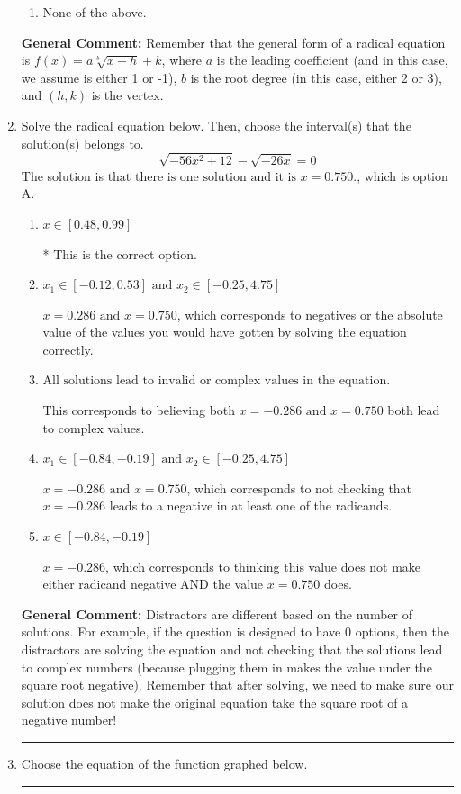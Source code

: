 \documentclass{extbook}[14pt]
\newcommand{\litem}[1]{\item #1

\rule{\textwidth}{0.4pt}}
\begin{document}
\begin{enumerate}
{\begin{enumerate}[label=\Alph*.]
\item None of the above.\end{enumerate}
\textbf{General Comment:} Remember that the general form of a radical equation is $ f(x) = a \sqrt[b]{x - h} + k $, where $a$ is the leading coefficient (and in this case, we assume is either 1 or -1), $b$ is the root degree (in this case, either 2 or 3), and $(h, k)$ is the vertex.
}
\litem{
Solve the radical equation below. Then, choose the interval(s) that the solution(s) belongs to.
\[ \sqrt{-56 x^2 + 12} - \sqrt{-26 x} = 0 \]The solution is \( \text{that there is one solution and it is } x = 0.750. \), which is option A.\begin{enumerate}[label=\Alph*.]
\item \( x \in [0.48,0.99] \)

* This is the correct option.
\item \( x_1 \in [-0.12, 0.53] \text{ and } x_2 \in [-0.25,4.75] \)

$x = 0.286 \text{ and } x = 0.750$, which corresponds to negatives or the absolute value of the values you would have gotten by solving the equation correctly.
\item \( \text{All solutions lead to invalid or complex values in the equation.} \)

This corresponds to believing both $x = -0.286 \text{ and } x = 0.750$ both lead to complex values.
\item \( x_1 \in [-0.84, -0.19] \text{ and } x_2 \in [-0.25,4.75] \)

$x = -0.286 \text{ and } x = 0.750$, which corresponds to not checking that $x = -0.286$ leads to a negative in at least one of the radicands.
\item \( x \in [-0.84,-0.19] \)

$x = -0.286$, which corresponds to thinking this value does not make either radicand negative AND the value $x = 0.750$ does.
\end{enumerate}

\textbf{General Comment:} Distractors are different based on the number of solutions. For example, if the question is designed to have 0 options, then the distractors are solving the equation and not checking that the solutions lead to complex numbers (because plugging them in makes the value under the square root negative). Remember that after solving, we need to make sure our solution does not make the original equation take the square root of a negative number!
}
\litem{
Choose the equation of the function graphed below.

}
\end{enumerate}
\end{document}
